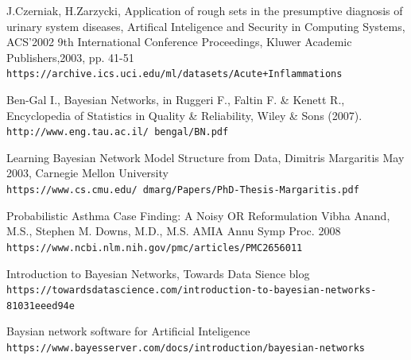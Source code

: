 \documentclass{article}
\begin{document}
\newpage
\begin{thebibliography}{9}

J.Czerniak, H.Zarzycki, Application of rough sets in the presumptive diagnosis of urinary system diseases, 
Artifical Inteligence and Security in Computing Systems, ACS'2002 9th International Conference Proceedings, 
Kluwer Academic Publishers,2003, pp. 41-51 
\\\texttt{https://archive.ics.uci.edu/ml/datasets/Acute+Inflammations}

Ben-Gal I., Bayesian Networks, in Ruggeri F., Faltin F. \& Kenett R.,
Encyclopedia of Statistics in Quality \& Reliability, Wiley \& Sons (2007). 
\\\texttt{http://www.eng.tau.ac.il/~bengal/BN.pdf}

Learning Bayesian Network Model Structure from Data, Dimitris Margaritis
May 2003, Carnegie Mellon University
\\\texttt{https://www.cs.cmu.edu/~dmarg/Papers/PhD-Thesis-Margaritis.pdf}

Probabilistic Asthma Case Finding: A Noisy OR Reformulation
Vibha Anand, M.S., Stephen M. Downs, M.D., M.S.
AMIA Annu Symp Proc. 2008
\\\texttt{https://www.ncbi.nlm.nih.gov/pmc/articles/PMC2656011}

Introduction to Bayesian Networks, Towards Data Sience blog
\\\texttt{https://towardsdatascience.com/introduction-to-bayesian-networks-81031eeed94e}

Baysian network software for Artificial Inteligence
\\\texttt{https://www.bayesserver.com/docs/introduction/bayesian-networks}

\end{thebibliography}
\newpage

\listoffigures
\newpage
\end{document}
